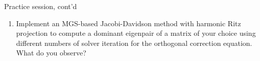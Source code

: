 \documentclass[t,usepdftitle=false]{beamer}
\begin{document}
\begin{frame}[fragile]{Practice session, cont'd}
\begin{enumerate}
\item Implement an MGS-based Jacobi-Davidson method with harmonic Ritz projection to compute a dominant eigenpair of a matrix of your choice using different numbers of solver iteration for the orthogonal correction equation.
What do you observe?
\end{enumerate}
\end{frame}
\end{document}
